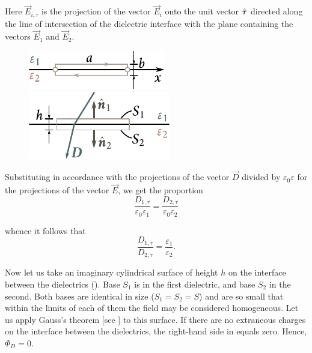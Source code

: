 \noindent
Here $\vec{E}_{i,\tau}$ is the projection of the vector $\vec{E}_i$ onto the unit vector $\hat{\boldsymbol{\tau}}$ directed along the line of intersection of the dielectric interface with the plane containing the vectors $\vec{E}_1$ and $\vec{E}_2$.

\begin{figure}[t]
	\begin{minipage}[t]{0.48\linewidth}
		\begin{center}
			\includegraphics[scale=1.0]{figures/ch_02/fig_2_9.pdf}
			\caption[]{}
			\label{fig:2_9}
		\end{center}
	\end{minipage}
	\hfill{}%
	\begin{minipage}[t]{0.48\linewidth}
		\begin{center}
			\includegraphics[scale=1.0]{figures/ch_02/fig_2_10.pdf}
			\caption[]{}
			\label{fig:2_10}
		\end{center}
	\end{minipage}
\vspace{-0.4cm}
\end{figure}

Substituting in accordance with  the projections of the vector $\vec{D}$ divided by $\varepsilon_0\varepsilon$ for the projections of the vector $\vec{E}$, we get the proportion
\begin{equation*}
    \frac{D_{1,\tau}}{\varepsilon_0\varepsilon_1} = \frac{D_{2,\tau}}{\varepsilon_0\varepsilon_2}
\end{equation*}

\noindent
whence it follows that
\begin{equation}\label{eq:2_45}
    \frac{D_{1,\tau}}{D_{2,\tau}} = \frac{\varepsilon_1}{\varepsilon_2}.
\end{equation}

Now let us take an imaginary cylindrical surface of height $h$ on the interface between the dielectrics (). Base $S_1$ is in the first dielectric, and base $S_2$ in the second. Both bases are identical in size ($S_1=S_2=S$) and are so small that within the limits of each of them the field may be considered homogeneous. Let us apply Gauss's theorem [see ] to this surface. If there are no extraneous charges on the interface between the dielectrics, the right-hand side in  equals zero. Hence, $\Phi_D=0$.

